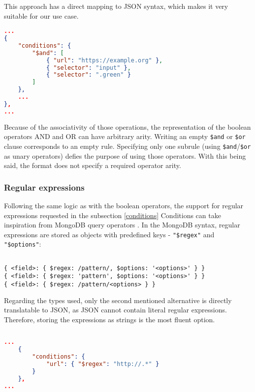 This approach has a direct mapping to JSON syntax, which makes it very suitable for our use case.

\begin{minipage}{0.95\linewidth}
\begin{lstlisting}[language=json, columns=spaceflexible]
...
{
    "conditions": {
        "$and": [
            { "url": "https://example.org" },
            { "selector": "input" },
            { "selector": ".green" }
        ]
    },
    ...
},
...

\end{lstlisting}
\end{minipage}

Because of the associativity of those operations, the representation of the boolean operators AND and OR can have arbitrary arity.
Writing an empty \texttt{\$and} or \texttt{\$or} clause corresponds to an empty rule. 
Specifying only one subrule (using \texttt{\$and}/\texttt{\$or} as unary operators) defies the purpose of using those operators. 
With this being said, the format does not specify a required operator arity. 

\subsubsection{Regular expressions}

Following the same logic as with the boolean operators, the support for regular expressions requested in the subsection \ref{conditions} Conditions can take inspiration from MongoDB query operators .
In the MongoDB syntax, regular expressions are stored as objects with predefined keys - \texttt{"\$regex"} and \texttt{"\$options"}:

\begin{minipage}{0.95\linewidth}
    \begin{verbatim}
    
{ <field>: { $regex: /pattern/, $options: '<options>' } }
{ <field>: { $regex: 'pattern', $options: '<options>' } }
{ <field>: { $regex: /pattern/<options> } }
    \end{verbatim}
\end{minipage}

Regarding the types used, only the second mentioned alternative is directly translatable to JSON, as JSON cannot contain literal regular expressions. 
Therefore, storing the expressions as strings is the most fluent option.

\begin{minipage}{0.95\linewidth}
\begin{lstlisting}[language=json, columns=spaceflexible]
        
...
    { 
        "conditions": {
            "url": { "$regex": "http://.*" }
        } 
    },
...

\end{lstlisting}
\end{minipage}

